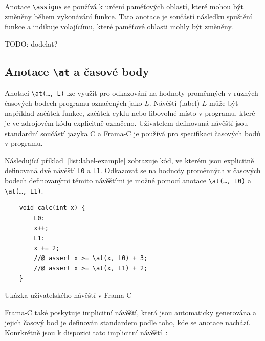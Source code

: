 Anotace \texttt{\textbackslash assigns} se používá k určení paměťových oblastí,
které mohou být změněny během vykonávání funkce.
Tato anotace je součástí následku spuštění funkce
a indikuje volajícímu, které paměťové oblasti mohly být změněny.

TODO: dodelat?


\subsection{Anotace \texttt{\textbackslash at} a časové body}
\label{subsec:acsl-anotace-at-a-casove-body}


Anotaci \texttt{\textbackslash at(\dots, L)} lze využít pro odkazování na hodnoty proměnných
v různých časových bodech programu označených jako $L$.
Návěští (label) $L$ může být například začátek funkce, začátek cyklu nebo libovolné místo v programu,
které je ve zdrojovém kódu explicitně označeno.
Uživatelem definovaná návěští jsou standardní součástí jazyka C
a Frama\mbox{-}C je používá pro specifikaci časových bodů v programu.

Následující příklad~\ref{list:label-example} zobrazuje kód,
ve kterém jsou explicitně definovaná dvě návěští \texttt{L0} a \texttt{L1}.
Odkazovat se na hodnoty proměnných v časových bodech definovanými těmito návěštími
je možné pomocí anotace \texttt{\textbackslash at(\dots, L0)} a \texttt{\textbackslash at(\dots, L1)}.

\begin{listing}[H]
    \begin{verbatim}
    void calc(int x) {
        L0:
        x++;
        L1:
        x += 2;
        //@ assert x >= \at(x, L0) + 3;
        //@ assert x >= \at(x, L1) + 2;
    }
    \end{verbatim}
    \caption{Ukázka uživatelského návěští v Frama-C}
    \label{list:label-example}
\end{listing}

Frama\mbox{-}C také poskytuje implicitní návěští,
která jsou automaticky generována a jejich časový bod je definován
standardem podle toho, kde se anotace nachází.
Konrkrétně jsou k dispozici tato implicitní návěští~\cite{ACSLSpec}:

